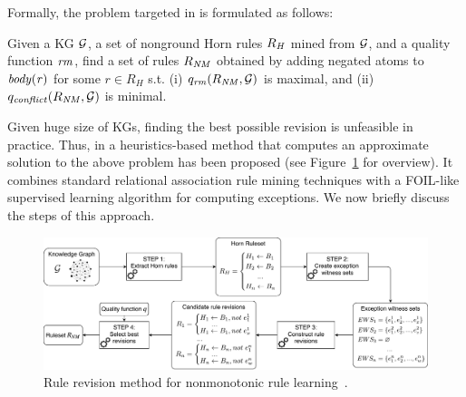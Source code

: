 Formally, the problem targeted in \cite{gad2016,rumis} is formulated as follows: 
\begin{definition} Given a KG $\mathcal{G}$,
a set of nonground Horn rules $R_{\mathit{H}}$ mined from $\mathcal{G}$, and a quality
function $\mathit{rm}$, %
find a set of rules $R_{\mathit{NM}}$ obtained by
adding negated atoms to $\mathit{body(r)}$ for some $r{\in} R_{H}$ s.t. (i)
${q_{\mathit{rm}}(R_{\mathit{NM}},\mathcal{G})}$ is maximal, and (ii)
${q_{\mathit{conflict}}(R_{\mathit{NM}},\mathcal{G})}$ is minimal.
\end{definition}



Given huge size of KGs, finding the best possible revision is unfeasible in practice. Thus, in \cite{gad2016,rumis} a heuristics-based method that computes an approximate solution to the above problem has been proposed  (see Figure~\ref{fig:iswc_process} for overview). It combines standard relational association rule mining techniques with a FOIL-like supervised learning algorithm \cite{foil} for computing exceptions. We now briefly discuss the steps of this approach.

\begin{figure}[t]
\centering
\includegraphics[width=1\textwidth]{figures/overview_new}
\caption{Rule revision method for nonmonotonic rule learning~\cite{gad2016,rumis}.}
\label{fig:iswc_process}
\end{figure}
\bigskip

